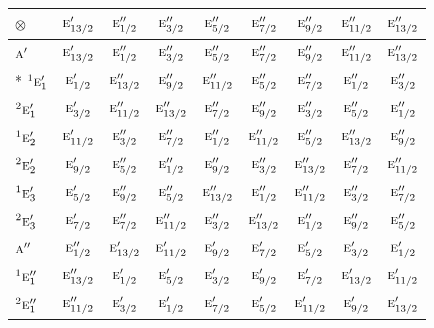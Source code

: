 \documentclass[10pt,a4paper]{article}
\numberwithin{equation}{section}
\newcommand{\irr}[1]{\text{\normalfont\scshape #1}}
\newcommand{\conjpair}[1]{{}^{#1}}
\newcommand{\irrprod}{\otimes}
\begin{document}
{\small\setlength{\tabcolsep}{3pt}\begin{longtable}{@{}lcccccccc@{}}\toprule
$\irrprod$ & $\irr{e}_{13/2}'$ & $\irr{e}_{1/2}''$ & $\irr{e}_{3/2}''$ & $\irr{e}_{5/2}''$ & $\irr{e}_{7/2}''$ & $\irr{e}_{9/2}''$ & $\irr{e}_{11/2}''$ & $\irr{e}_{13/2}''$\\\midrule\endhead
\bottomrule\endfoot\endlastfoot
$\irr{a}'$ & $\irr{e}_{13/2}'$ & $\irr{e}_{1/2}''$ & $\irr{e}_{3/2}''$ & $\irr{e}_{5/2}''$ & $\irr{e}_{7/2}''$ & $\irr{e}_{9/2}''$ & $\irr{e}_{11/2}''$ & $\irr{e}_{13/2}''$\\*
$\conjpair{1}\irr{e}_{1}'$ & $\irr{e}_{1/2}'$ & $\irr{e}_{13/2}''$ & $\irr{e}_{9/2}''$ & $\irr{e}_{11/2}''$ & $\irr{e}_{5/2}''$ & $\irr{e}_{7/2}''$ & $\irr{e}_{1/2}''$ & $\irr{e}_{3/2}''$\\
$\conjpair{2}\irr{e}_{1}'$ & $\irr{e}_{3/2}'$ & $\irr{e}_{11/2}''$ & $\irr{e}_{13/2}''$ & $\irr{e}_{7/2}''$ & $\irr{e}_{9/2}''$ & $\irr{e}_{3/2}''$ & $\irr{e}_{5/2}''$ & $\irr{e}_{1/2}''$\\
$\conjpair{1}\irr{e}_{2}'$ & $\irr{e}_{11/2}'$ & $\irr{e}_{3/2}''$ & $\irr{e}_{7/2}''$ & $\irr{e}_{1/2}''$ & $\irr{e}_{11/2}''$ & $\irr{e}_{5/2}''$ & $\irr{e}_{13/2}''$ & $\irr{e}_{9/2}''$\\
$\conjpair{2}\irr{e}_{2}'$ & $\irr{e}_{9/2}'$ & $\irr{e}_{5/2}''$ & $\irr{e}_{1/2}''$ & $\irr{e}_{9/2}''$ & $\irr{e}_{3/2}''$ & $\irr{e}_{13/2}''$ & $\irr{e}_{7/2}''$ & $\irr{e}_{11/2}''$\\
$\conjpair{1}\irr{e}_{3}'$ & $\irr{e}_{5/2}'$ & $\irr{e}_{9/2}''$ & $\irr{e}_{5/2}''$ & $\irr{e}_{13/2}''$ & $\irr{e}_{1/2}''$ & $\irr{e}_{11/2}''$ & $\irr{e}_{3/2}''$ & $\irr{e}_{7/2}''$\\
$\conjpair{2}\irr{e}_{3}'$ & $\irr{e}_{7/2}'$ & $\irr{e}_{7/2}''$ & $\irr{e}_{11/2}''$ & $\irr{e}_{3/2}''$ & $\irr{e}_{13/2}''$ & $\irr{e}_{1/2}''$ & $\irr{e}_{9/2}''$ & $\irr{e}_{5/2}''$\\
$\irr{a}''$ & $\irr{e}_{1/2}''$ & $\irr{e}_{13/2}'$ & $\irr{e}_{11/2}'$ & $\irr{e}_{9/2}'$ & $\irr{e}_{7/2}'$ & $\irr{e}_{5/2}'$ & $\irr{e}_{3/2}'$ & $\irr{e}_{1/2}'$\\
$\conjpair{1}\irr{e}_{1}''$ & $\irr{e}_{13/2}''$ & $\irr{e}_{1/2}'$ & $\irr{e}_{5/2}'$ & $\irr{e}_{3/2}'$ & $\irr{e}_{9/2}'$ & $\irr{e}_{7/2}'$ & $\irr{e}_{13/2}'$ & $\irr{e}_{11/2}'$\\
$\conjpair{2}\irr{e}_{1}''$ & $\irr{e}_{11/2}''$ & $\irr{e}_{3/2}'$ & $\irr{e}_{1/2}'$ & $\irr{e}_{7/2}'$ & $\irr{e}_{5/2}'$ & $\irr{e}_{11/2}'$ & $\irr{e}_{9/2}'$ & $\irr{e}_{13/2}'$\\

\end{longtable}}
\end{document}
